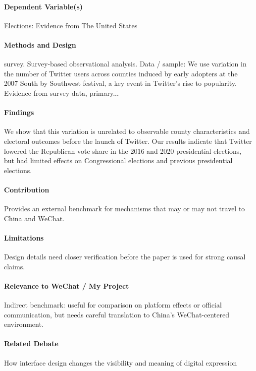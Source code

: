 \documentclass[12pt]{article}
\begin{document}
\paragraph{Dependent Variable(s)} Elections: Evidence from The United States

\paragraph{Methods and Design} survey. Survey-based observational analysis. Data / sample: We use variation in the number of Twitter users across counties induced by early adopters at the 2007 South by Southwest festival, a key event in Twitter's rise to popularity. Evidence from survey data, primary...

\paragraph{Findings} We show that this variation is unrelated to observable county characteristics and electoral outcomes before the launch of Twitter. Our results indicate that Twitter lowered the Republican vote share in the 2016 and 2020 presidential elections, but had limited effects on Congressional elections and previous presidential elections.

\paragraph{Contribution} Provides an external benchmark for mechanisms that may or may not travel to China and WeChat.

\paragraph{Limitations} Design details need closer verification before the paper is used for strong causal claims.

\paragraph{Relevance to WeChat / My Project} Indirect benchmark: useful for comparison on platform effects or official communication, but needs careful translation to China's WeChat-centered environment.

\paragraph{Related Debate} How interface design changes the visibility and meaning of digital expression
\end{document}
